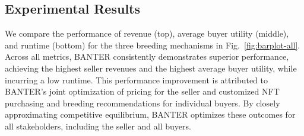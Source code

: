 \documentclass[conference]{IEEEtran}
\theoremstyle{plain}
\begin{document}

\subsection{Experimental Results} %
\label{subsec:exp-main}

We compare the performance of revenue (top), average buyer utility (middle), and runtime (bottom) for the three breeding mechanisms in Fig.~\ref{fig:barplot-all}. Across all metrics, BANTER\xspace consistently demonstrates superior performance, achieving the highest seller revenues and the highest average buyer utility, while incurring a low runtime. This performance improvement is attributed to BANTER\xspace's joint optimization of pricing for the seller and customized NFT purchasing and breeding recommendations for individual buyers. By closely approximating competitive equilibrium, BANTER\xspace optimizes these outcomes for all stakeholders, including the seller and all buyers.
\end{document}
